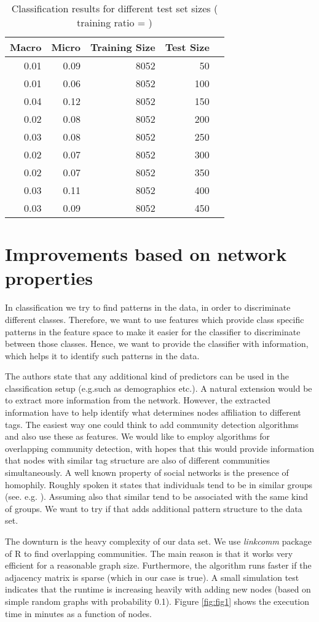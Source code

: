 \documentclass[11pt,letterpaper]{article}
\begin{document}
\begin{table}[ht]
	\centering
	\begin{tabular}{rrrrr}
		\hline
		Macro & Micro & Training Size & Test Size \\ 
		\hline
		0.01 & 0.09 & 8052 & 50 \\ 
		0.01 & 0.06 & 8052 & 100 \\ 
		0.04 & 0.12 & 8052 & 150 \\ 
		0.02 & 0.08 & 8052 & 200 \\ 
		0.03 & 0.08 & 8052 & 250 \\ 
		0.02 & 0.07 & 8052 & 300 \\ 
		0.02 & 0.07 & 8052 & 350 \\ 
		0.03 & 0.11 & 8052 & 400 \\ 
		0.03 & 0.09 & 8052 & 450 \\ 
		\hline
	\end{tabular}
	\caption{Classification results for different test set sizes ( training ratio =  )}
\end{table}

\section*{Improvements based on network properties}

In classification we try to find patterns in the data, in order to discriminate different classes. Therefore, we want to use features which provide class specific patterns in the feature space to make it easier for the classifier to discriminate between those classes. Hence, we want to provide the classifier with information, which helps it to identify such patterns in the data. \par
The authors state that any additional kind of predictors can be used in the classification setup (e.g.such as demographics etc.). A natural extension would be to extract more information from the network. However, the extracted information have to help identify what determines nodes affiliation to different tags. The easiest way one could think to add community detection algorithms and also use these as features. We would like to employ algorithms for overlapping community detection, with hopes that this would provide information that nodes with similar tag structure are also of different communities simultaneously. A well known property of social networks is the presence of homophily. Roughly spoken it states that individuals tend to be in similar groups (see. e.g. \cite{Mcpherson2016}). Assuming also that similar tend to be associated with the same kind of groups. We want to try if that adds additional pattern structure to the data set. \par
The downturn is the heavy complexity of our data set. We use \textit{linkcomm} package of R to find overlapping communities. The main reason is that it works very efficient for a reasonable graph size. Furthermore, the algorithm runs faster if the adjacency matrix is sparse (which in our case is true). A small simulation test indicates that the runtime is increasing heavily with adding new nodes (based on simple random graphs with probability 0.1). Figure \ref{fig:fig1} shows the execution time in minutes as a function of nodes. 
\end{document}
